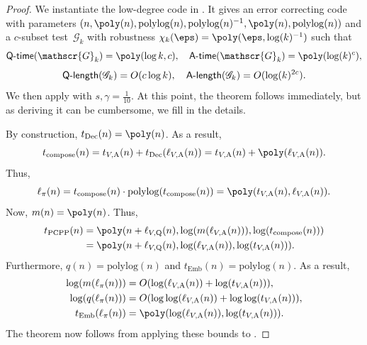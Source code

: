 \documentclass[11pt]{article}
\newcommand{\game}{\mathscr{G}}
\newcommand{\qtime}[1]{\mathsf{Q}\textnormal{-}\mathsf{time}(#1)}
\newcommand{\atime}[1]{\mathsf{A}\textnormal{-}\mathsf{time}(#1)}
\newcommand{\qlength}[1]{\mathsf{Q}\textnormal{-}\mathsf{length}(#1)}
\newcommand{\alength}[1]{\mathsf{A}\textnormal{-}\mathsf{length}(#1)}
\begin{document}
\begin{proof}
We instantiate the low-degree code in .
It gives an error correcting code with parameters $(n, \poly(n), \mathrm{poly log}(n), \mathrm{poly log}(n)^{-1},\poly(n), \mathrm{polylog}(n))$
and a $c$-subset test~$\game_k$ with robustness $\chi_k(\eps) = \poly(\eps, \log(k)^{-1})$ such that
\begin{equation*}
\qtime{\game_k} = \poly(\log k, c),
\quad
\atime{\game_k} = \poly(\log(k)^c),
\end{equation*}
\begin{equation*}
\qlength{\game_k} = O(c \log k),
\quad
\alength{\game_k} = O(\log(k)^{2c}).
\end{equation*}
We then apply  with $s, \gamma = \tfrac{1}{10}$.
At this point, the theorem follows immediately,
but as deriving it can be cumbersome, we fill in the details.

By construction, $t_{\mathrm{Dec}}(n) = \poly(n)$.
As a result,
\begin{equation*}
t_{\mathrm{compose}}(n)
= t_{V, \mathrm{A}}(n) + t_{\mathrm{Dec}}(\ell_{V,\mathrm{A}}(n))
= t_{V, \mathrm{A}}(n) + \poly(\ell_{V,\mathrm{A}}(n)).
\end{equation*}
Thus,
\begin{equation*}
\ell_\pi(n)
= t_{\mathrm{compose}}(n) \cdot \mathrm{poly log}(t_{\mathrm{compose}}(n))
= \poly(t_{V, \mathrm{A}}(n), \ell_{V,\mathrm{A}}(n)).
\end{equation*}
Now, $m(n) = \poly(n)$. Thus,
\begin{align*}
t_{\mathrm{PCPP}}(n)
&= \poly(n + \ell_{V, \mathrm{Q}}(n), \log(m(\ell_{V, \mathrm{A}}(n))), \log(t_{\mathrm{compose}}(n)))\\
&= \poly(n + \ell_{V, \mathrm{Q}}(n), \log(\ell_{V, \mathrm{A}}(n)), \log(t_{V, \mathrm{A}}(n))).
\end{align*}
Furthermore, $q(n) = \mathrm{polylog}(n)$ and $t_{\mathrm{Emb}}(n) = \mathrm{poly log}(n)$.
As a result,
\begin{align*}
\log(m(\ell_\pi(n))) &= O(\log(\ell_{V,\mathrm{A}}(n))+ \log(t_{V, \mathrm{A}}(n))),\\
\log(q(\ell_\pi(n))) &= O(\log \log(\ell_{V,\mathrm{A}}(n))+ \log \log(t_{V, \mathrm{A}}(n))),\\
t_{\mathrm{Emb}}(\ell_\pi(n)) &= \poly(\log(\ell_{V, \mathrm{A}}(n)), \log(t_{V, \mathrm{A}}(n))).
\end{align*}
The theorem now follows from applying these bounds to .
\end{proof}
\end{document}

